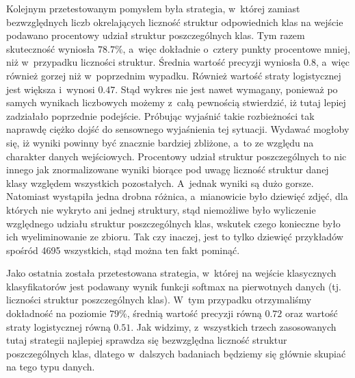 Kolejnym przetestowanym pomysłem była strategia, w~której zamiast bezwzględnych liczb okrelających liczność struktur odpowiednich klas na wejście podawano procentowy udział struktur poszczególnych klas. Tym razem skuteczność wyniosła $78.7\%$, a~więc dokładnie o~cztery punkty procentowe mniej, niż w~przypadku liczności struktur. Średnia wartość precyzji wyniosła $0.8$, a~więc również gorzej niż w~poprzednim wypadku. Również wartość straty logistycznej jest większa i~wynosi $0.47$. Stąd wykres nie jest nawet wymagany, ponieważ po samych wynikach liczbowych możemy z~całą pewnością stwierdzić, iż tutaj lepiej zadziałało poprzednie podejście. Próbując wyjaśnić takie rozbieżności tak naprawdę ciężko dojść do sensownego wyjaśnienia tej sytuacji. Wydawać mogłoby się, iż wyniki powinny być znacznie bardziej zbliżone, a~to ze względu na charakter danych wejściowych. Procentowy udział struktur poszczególnych to nic innego jak znormalizowane wyniki biorące pod uwagę liczność struktur danej klasy względem wszystkich pozostałych. A~jednak wyniki są dużo gorsze. Natomiast wystąpiła jedna drobna różnica, a~mianowicie było dziewięć zdjęć, dla których nie wykryto ani jednej struktury, stąd niemożliwe było wyliczenie względnego udziału struktur poszczególnych klas, wskutek czego konieczne było ich wyeliminowanie ze zbioru. Tak czy inaczej, jest to tylko dziewięć przykładów spośród 4695 wszystkich, stąd można ten fakt pominąć. 

Jako ostatnia została przetestowana strategia, w~której na wejście klasycznych klasyfikatorów jest podawany wynik funkcji softmax na pierwotnych danych (tj. liczności struktur poszczególnych klas). W~tym przypadku otrzymaliśmy dokładność na poziomie $79\%$, średnią wartość precyzji równą $0.72$ oraz wartość straty logistycznej równą $0.51$. Jak widzimy, z~wszystkich trzech zasosowanych tutaj strategii najlepiej sprawdza się bezwzględna liczność struktur poszczególnych klas, dlatego w~dalszych badaniach będziemy się głównie skupiać na tego typu danych. 

